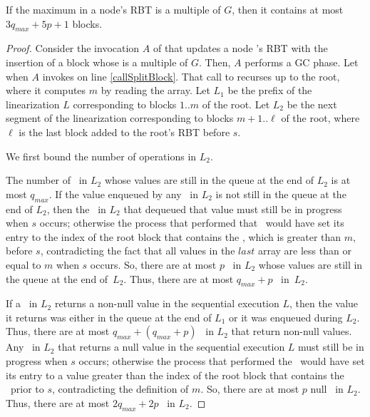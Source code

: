 \begin{lemma}\label{boundAfterGC}
If the maximum  in a node's RBT is a multiple of $G$, then
it contains at most $3q_{max}+5p+1$ blocks.
\end{lemma}
\begin{proof}
Consider the invocation $A$ of  that updates a node 's RBT with the insertion of a block whose 
 is a multiple of $G$.
Then, $A$ performs a GC phase.
Let  when $A$ invokes  on line \ref{callSplitBlock}.
That call to  recurses up to the root, where it computes $m$ by reading the 
array.
Let $L_1$ be the prefix of the linearization $L$ corresponding to blocks $1..m$ of the root.
Let $L_2$ be the next segment of the linearization corresponding to blocks $m+1..\ell$ of the root, where
$\ell$ is the last block added to the root's RBT before $s$.

We first bound the number of operations in $L_2$.

The number of \enqueues\ in $L_2$ whose values are still in the queue at the end of $L_2$ is at most $q_{max}$.
If the value enqueued by any \enqueue\ in $L_2$  is not still in the queue
at the end of $L_2$, then the \dequeue\ in $L_2$ that dequeued that value must still be in progress
when $s$ occurs; otherwise the process that performed that \dequeue\ would have set its  entry
to the index of the root block that contains the \enqueue, which is greater than $m$, before $s$, contradicting
the fact that all values in the $last$ array are less than or equal to $m$ when $s$ occurs.
So, there are at most $p$ \enqueues\ in $L_2$ whose values are still in the queue at the end of~$L_2$.
Thus, there are at most $q_{max}+p$ \enqueues\ in~$L_2$.

If a \dequeue\ in $L_2$ returns a non-null value in the sequential execution $L$,
then the value it returns was either in the queue at the end of $L_1$ or it was enqueued during $L_2$.
Thus, there are at most $q_{max}+(q_{max}+p)$ \dequeues\ in $L_2$ that return non-null values.
Any \dequeue\ in $L_2$ that returns a null value in the sequential execution $L$ must still be in progress
when $s$ occurs; otherwise the process that performed the \dequeue\ would have set its  entry
to a value greater than the index of the root block that contains the \dequeue\ prior to $s$, 
contradicting the definition of $m$.
So, there are at most $p$ null \dequeues\ in $L_2$.
Thus, there are at most $2q_{max} + 2p$ \dequeues\ in $L_2$.


\end{proof}
